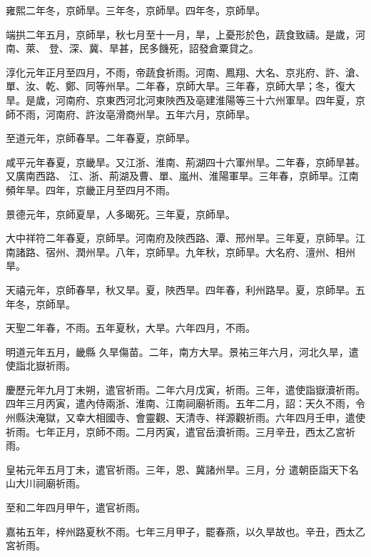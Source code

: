 \begin{pinyinscope}
 雍熙二年冬，京師旱。三年冬，京師旱。四年冬，京師旱。



 端拱二年五月，京師旱，秋七月至十一月，旱，上憂形於色，蔬食致禱。是歲，河南、萊、
 登、深、冀、旱甚，民多饑死，詔發倉粟貸之。



 淳化元年正月至四月，不雨，帝蔬食祈雨。河南、鳳翔、大名、京兆府、許、滄、單、汝、乾、鄭、同等州旱。二年春，京師大旱。三年春，京師大旱；冬，復大旱。是歲，河南府、京東西河北河東陜西及亳建淮陽等三十六州軍旱。四年夏，京師不雨，河南府、許汝亳滑商州旱。五年六月，京師旱。



 至道元年，京師春旱。二年春夏，京師旱。



 咸平元年春夏，京畿旱。又江浙、淮南、荊湖四十六軍州旱。二年春，京師旱甚。又廣南西路、
 江、浙、荊湖及曹、單、嵐州、淮陽軍旱。三年春，京師旱。江南頻年旱。四年，京畿正月至四月不雨。



 景德元年，京師夏旱，人多暍死。三年夏，京師旱。



 大中祥符二年春夏，京師旱。河南府及陜西路、潭、邢州旱。三年夏，京師旱。江南諸路、宿州、潤州旱。八年，京師旱。九年秋，京師旱。大名府、澶州、相州旱。



 天禧元年，京師春旱，秋又旱。夏，陜西旱。四年春，利州路旱。夏，京師旱。五年冬，京師旱。



 天聖二年春，不雨。五年夏秋，大旱。六年四月，不雨。



 明道元年五月，畿縣
 久旱傷苗。二年，南方大旱。景祐三年六月，河北久旱，遣使詣北嶽祈雨。



 慶歷元年九月丁未朔，遣官祈雨。二年六月戊寅，祈雨。三年，遣使詣嶽瀆祈雨。四年三月丙寅，遣內侍兩浙、淮南、江南祠廟祈雨。五年二月，詔：天久不雨，令州縣決淹獄，又幸大相國寺、會靈觀、天清寺、祥源觀祈雨。六年四月壬申，遣使祈雨。七年正月，京師不雨。二月丙寅，遣官岳瀆祈雨。三月辛丑，西太乙宮祈雨。



 皇祐元年五月丁未，遣官祈雨。三年，恩、冀諸州旱。三月，分
 遣朝臣詣天下名山大川祠廟祈雨。



 至和二年四月甲午，遣官祈雨。



 嘉祐五年，梓州路夏秋不雨。七年三月甲子，罷春燕，以久旱故也。辛丑，西太乙宮祈雨。




\end{pinyinscope}
